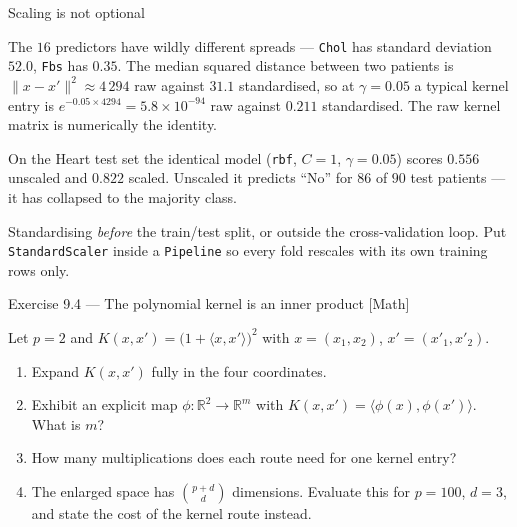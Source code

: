 \documentclass[aspectratio=169,11pt]{beamer}
\begin{document}
\begin{frame}{Scaling is not optional}
  \footnotesize
  \begin{numexample}
    The $16$ predictors have wildly different spreads --- \texttt{Chol} has
    standard deviation $52.0$, \texttt{Fbs} has $0.35$. The median squared
    distance between two patients is $\|x-x'\|^2 \approx 4\,294$ raw against
    $31.1$ standardised, so at $\gamma=0.05$ a typical kernel entry is
    $e^{-0.05\times 4294} = 5.8\times10^{-94}$ raw against $0.211$
    standardised. The raw kernel matrix is numerically the identity.
  \end{numexample}
  \begin{takeaway}
    On the Heart test set the identical model (\texttt{rbf}, $C=1$,
    $\gamma=0.05$) scores $0.556$ unscaled and $\mathbf{0.822}$ scaled.
    Unscaled it predicts ``No'' for $86$ of $90$ test patients --- it has
    collapsed to the majority class.
  \end{takeaway}
  \begin{mistake}
    Standardising \emph{before} the train/test split, or outside the
    cross-validation loop. Put \texttt{StandardScaler} inside a
    \texttt{Pipeline} so every fold rescales with its own training rows only.
  \end{mistake}
\end{frame}

\begin{frame}{Exercise 9.4 --- The polynomial kernel is an inner product [Math]}
\begin{exercise}
  Let $p=2$ and $K(x,x') = \big(1+\langle x,x'\rangle\big)^2$ with
  $x=(x_1,x_2)$, $x'=(x'_1,x'_2)$.
  \begin{enumerate}
    \item Expand $K(x,x')$ fully in the four coordinates.
    \item Exhibit an explicit map $\phi:\mathbb{R}^2\to\mathbb{R}^m$ with
          $K(x,x')=\langle\phi(x),\phi(x')\rangle$. What is $m$?
    \item How many multiplications does each route need for one kernel entry?
    \item The enlarged space has $\binom{p+d}{d}$ dimensions. Evaluate this for
          $p=100$, $d=3$, and state the cost of the kernel route instead.
  \end{enumerate}
\end{exercise}
\end{frame}
\end{document}
